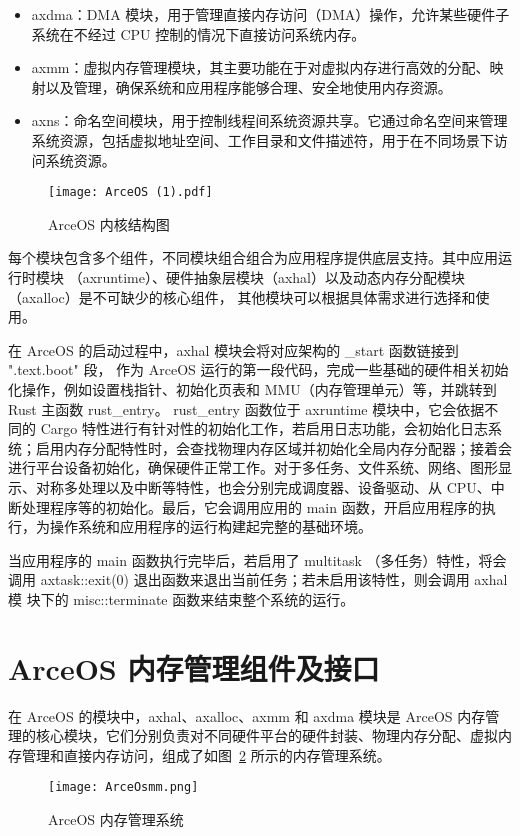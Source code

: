 \begin{itemize}
\item axdma：DMA 模块，用于管理直接内存访问（DMA）操作，允许某些硬件子系统在不经过 CPU 控制的情况下直接访问系统内存。
\item axmm：虚拟内存管理模块，其主要功能在于对虚拟内存进行高效的分配、映射以及管理，确保系统和应用程序能够合理、安全地使用内存资源。
\item axns：命名空间模块，用于控制线程间系统资源共享。它通过命名空间来管理系统资源，包括虚拟地址空间、工作目录和文件描述符，用于在不同场景下访问系统资源。
\end{itemize}

\begin{figure}
  \centering
  \texttt{[image: ArceOS (1).pdf]}
  \caption{ArceOS 内核结构图}
  \label{fig:ArceOS}
\end{figure}

每个模块包含多个组件，不同模块组合组合为应用程序提供底层支持。其中应用运行时模块
（axruntime）、硬件抽象层模块（axhal）以及动态内存分配模块（axalloc）是不可缺少的核心组件，
其他模块可以根据具体需求进行选择和使用。

在 ArceOS 的启动过程中，axhal 模块会将对应架构的 \_start 函数链接到 ".text.boot" 段， 作为 ArceOS 运行的第一段代码，完成一些基础的硬件相关初始化操作，例如设置栈指针、初始化页表和 MMU（内存管理单元）等，并跳转到 Rust 主函数 rust\_entry。
rust\_entry 函数位于 axruntime 模块中，它会依据不同的 Cargo 特性进行有针对性的初始化工作，若启用日志功能，会初始化日志系统；启用内存分配特性时，会查找物理内存区域并初始化全局内存分配器；接着会进行平台设备初始化，确保硬件正常工作。对于多任务、文件系统、网络、图形显示、对称多处理以及中断等特性，也会分别完成调度器、设备驱动、从 CPU、中断处理程序等的初始化。最后，它会调用应用的 main 函数，开启应用程序的执行，为操作系统和应用程序的运行构建起完整的基础环境。

当应用程序的 main 函数执行完毕后，若启用了 multitask （多任务）特性，将会调用 axtask::exit(0) 退出函数来退出当前任务；若未启用该特性，则会调用 axhal 模
块下的 misc::terminate 函数来结束整个系统的运行。

\section{ArceOS 内存管理组件及接口}
在 ArceOS 的模块中，axhal、axalloc、axmm 和 axdma 模块是 ArceOS 内存管理的核心模块，它们分别负责对不同硬件平台的硬件封装、物理内存分配、虚拟内存管理和直接内存访问，组成了如图~\ref{fig:ArceOS-mm} 所示的内存管理系统。

\begin{figure}
  \centering
  \texttt{[image: ArceOsmm.png]}
  \caption{ArceOS 内存管理系统}
  \label{fig:ArceOS-mm}
\end{figure}

